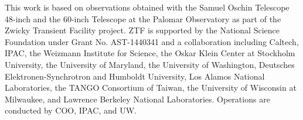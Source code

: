 \documentclass[twocolumn]{aastex63}
\begin{document}
\acknowledgements

This work is based on observations obtained with the Samuel Oschin Telescope
48-inch and the 60-inch Telescope at the Palomar Observatory as part of the
Zwicky Transient Facility project. ZTF is supported by the National Science
Foundation under Grant No. AST-1440341 and a collaboration including Caltech,
IPAC, the Weizmann Institute for Science, the Oskar Klein Center at Stockholm
University, the University of Maryland, the University of Washington,
Deutsches Elektronen-Synchrotron and Humboldt University, Los Alamos National
Laboratories, the TANGO Consortium of Taiwan, the University of Wisconsin at
Milwaukee, and Lawrence Berkeley National Laboratories. Operations are
conducted by COO, IPAC, and UW.







\end{document}
